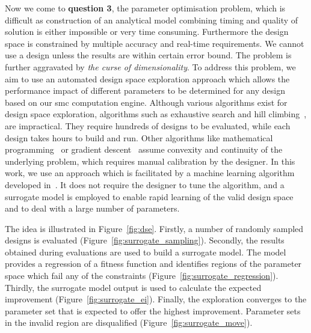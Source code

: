 Now we come to \textbf{question 3}, the parameter optimisation problem, which is difficult as construction of an analytical model combining timing and quality of solution is either impossible or very time consuming. 
Furthermore the design space is constrained by multiple accuracy and real-time requirements.
We cannot use a design unless the results are within certain error bound.
The problem is further aggravated by \textit{the curse of dimensionality}.
To address this problem, we aim to use an automated design space exploration approach which allows the performance impact of different parameters to be determined for any design based on our \gls{smc} computation engine.
Although various algorithms exist for design space exploration, algorithms such as exhaustive search and hill climbing~\cite{stuart03}, are impractical.
They require hundreds of designs to be evaluated, while each design takes hours to build and run.
Other algorithms like mathematical programming~\cite{thomas89} or gradient descent~\cite{avriel03} assume convexity and continuity of the underlying problem, which requires manual calibration by the designer.
In this work, we use an approach which is facilitated by a machine learning algorithm developed in~\cite{kurek14fccm}.
It does not require the designer to tune the algorithm, and a surrogate model is employed to enable rapid learning of the valid design space and to deal with a large number of parameters.


The idea is illustrated in Figure~\ref{fig:dse}.
Firstly, a number of randomly sampled designs is evaluated (Figure~\ref{fig:surrogate_sampling}).
Secondly, the results obtained during evaluations are used to build a surrogate model.
The model provides a regression of a fitness function and identifies regions of the parameter space which fail any of the constraints (Figure~\ref{fig:surrogate_regression}).
Thirdly, the surrogate model output is used to calculate the expected improvement (Figure~\ref{fig:surrogate_ei}).
Finally, the exploration converges to the parameter set that is expected to offer the highest improvement.
Parameter sets in the invalid region are disqualified (Figure~\ref{fig:surrogate_move}).

